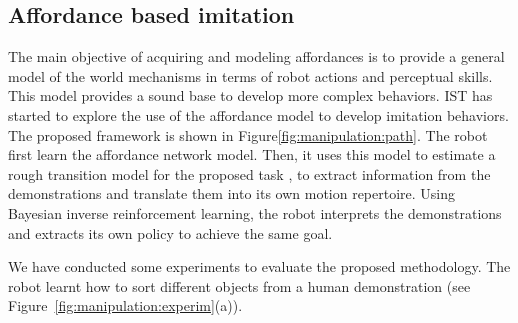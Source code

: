 \subsection{Affordance based imitation}
The main objective of acquiring and modeling affordances is to provide
a general model of the world mechanisms in terms of robot actions and
perceptual skills. This model provides a sound base to develop more
complex behaviors. IST has started to explore the use of the
affordance model to develop imitation behaviors. The proposed
framework is shown in Figure\ref{fig:manipulation:path}. The robot
first learn the affordance network model. Then, it uses this model to
estimate a rough transition model for the proposed task , to extract
information from the demonstrations and translate them into its own
motion repertoire. Using Bayesian inverse reinforcement learning, the
robot interprets the demonstrations and extracts its own policy to
achieve the same goal.

We have conducted some experiments to evaluate the proposed methodology. The robot learnt how to sort different objects from a human demonstration (see Figure~\ref{fig:manipulation:experim}(a)).
 
